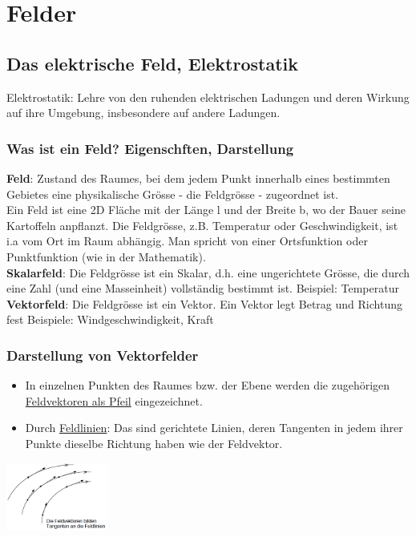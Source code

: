 \section{Felder}
\subsection{Das elektrische Feld, Elektrostatik}
Elektrostatik: Lehre von den ruhenden elektrischen Ladungen und deren Wirkung auf ihre Umgebung, insbesondere auf andere Ladungen.\\
\subsubsection{Was ist ein Feld? Eigenschften, Darstellung}
\textbf{Feld}: Zustand des Raumes, bei dem jedem Punkt innerhalb eines bestimmten Gebietes eine physikalische Grösse - die Feldgrösse - zugeordnet ist.\\
Ein Feld ist eine 2D Fläche mit der Länge l und der Breite b, wo der Bauer seine Kartoffeln anpflanzt.
Die Feldgrösse, z.B. Temperatur oder Geschwindigkeit, ist i.a vom Ort im Raum abhängig. Man spricht von einer Ortsfunktion oder Punktfunktion (wie in der Mathematik).\\
\textbf{Skalarfeld}: Die Feldgrösse ist ein Skalar, d.h. eine ungerichtete Grösse, die durch eine Zahl (und eine Masseinheit) vollständig bestimmt ist. Beispiel: Temperatur\\
\textbf{Vektorfeld}: Die Feldgrösse ist ein Vektor. Ein Vektor legt Betrag und Richtung fest Beispiele: Windgeschwindigkeit, Kraft\\

\subsubsection{Darstellung von Vektorfelder}
\begin{multicols}{2}
\begin{itemize}
	\item In einzelnen Punkten des Raumes bzw. der Ebene werden die zugehörigen
	\underline{Feldvektoren als Pfeil} eingezeichnet.
	\item Durch \underline{Feldlinien}: Das sind gerichtete Linien, deren Tangenten in jedem ihrer Punkte dieselbe Richtung haben wie der Feldvektor.\\
\end{itemize}
\includegraphics[width=0.25\textwidth]{pics/felder/Feldvektoren}
\end{multicols}
